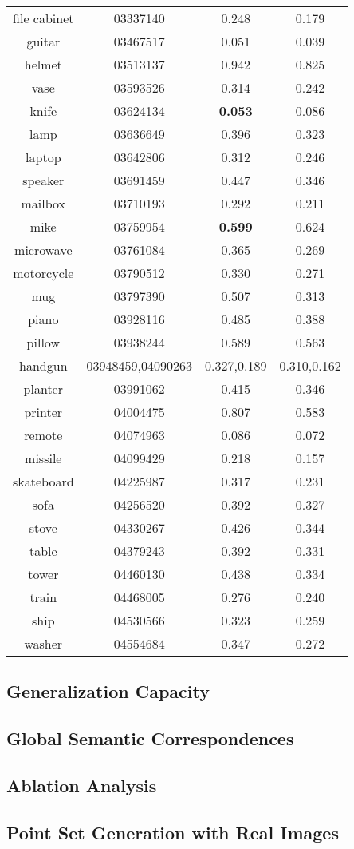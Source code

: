 \begin{table*}
\begin{tabular}{c c c c}
		file cabinet& 03337140 & 0.248 & 0.179\\
		guitar & 03467517 & 0.051 & 0.039\\
		helmet & 03513137 & 0.942 & 0.825\\
		vase & 03593526 & 0.314 & 0.242\\
		knife & 03624134 & {\color{green} \textbf{0.053}}  & 0.086\\
		lamp & 03636649 & 0.396 & 0.323\\
		laptop & 03642806 & 0.312 & 0.246\\
		speaker & 03691459 & 0.447 & 0.346\\
		mailbox & 03710193 & 0.292 & 0.211\\
		mike & 03759954 & {\color{green} \textbf{0.599}} & 0.624\\
		microwave & 03761084 & 0.365 & 0.269\\
		motorcycle & 03790512 & 0.330 & 0.271\\
		mug & 03797390 & 0.507 & 0.313\\
		piano & 03928116 & 0.485 & 0.388\\
		pillow & 03938244 & 0.589 & 0.563\\
		handgun & 03948459,04090263 & 0.327,0.189 & 0.310,0.162\\
		planter & 03991062 & 0.415 & 0.346\\
		printer & 04004475 & 0.807 & 0.583\\
		remote & 04074963 & 0.086 & 0.072\\
		missile & 04099429 & 0.218 & 0.157\\
		skateboard & 04225987 & 0.317 & 0.231\\
		sofa & 04256520 & 0.392 & 0.327\\
		stove & 04330267 & 0.426 & 0.344\\
		table & 04379243 & 0.392 & 0.331\\
		tower & 04460130 & 0.438 & 0.334\\
		train & 04468005 & 0.276 & 0.240\\
		ship  & 04530566 & 0.323 & 0.259\\
		washer &  04554684 & 0.347 & 0.272\\
	\end{tabular}
	\label{tab:seg}
\end{table*}

\subsection{Generalization Capacity}
\subsection{Global Semantic Correspondences}
\subsection{Ablation Analysis}
\subsection{Point Set Generation with Real Images}